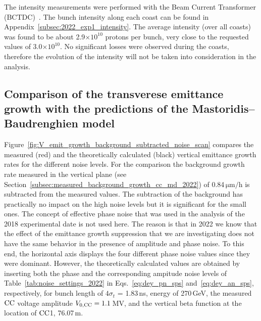 The intensity measurements were performed with the Beam Current Transformer (BCTDC)~\cite{Jones:1982418, Jakob:624188}. The bunch intensity along each coast can be found in Appendix~\ref{subsec:2022_exp1_intensity}. The average intensity (over all coasts) was found to be about 2.9$\times 10^{10}$ protons per bunch, very close to the requested values of 3.0$\times 10^{10}$. No significant losses were observed during the coasts, therefore the evolution of the intensity will not be taken into consideration in the analysis.

\subsection{Comparison of the transverese emittance growth with the predictions of the Mastoridis--Baudrenghien model}\label{sec:cc_exp1_2022_theory_vs_measurements}

Figure~\ref{fig:V_emit_growth_background_subtracted_noise_scan} compares the measured (red) and the theoretically calculated (black) vertical emittance growth rates for the different noise levels. For the comparison the background growth rate measured in the vertical plane (see Section~\ref{subsec:measured_background_growth_cc_md_2022}) of 0.84\,$\mathrm{\mu m /h}$ is subtracted from the measured values. The subtraction of the background has practically no impact on the high noise levels but it is significant for the small ones. The concept of effective phase noise that was used in the analysis of the 2018 experimental date is not used here. The reason is that in 2022 we know that the effect of the emittance growth suppression that we are investigating does not have the same behavior in the presence of amplitude and phase noise. To this end, the horizontal axis displays the four different phase noise values since they were dominant. However, the theoretically calculated values are obtained by inserting both the phase and the corresponding ampitude noise levels of Table~\ref{tab:noise_settings_2022} in Eqs.~\eqref{eq:dey_pn_sps} and~\eqref{eq:dey_an_sps}, respectively, for bunch length of $4 \sigma_t$ = 1.83\,ns, energy of 270\,GeV, the measured ${\mathrm{CC}}$ voltage amplitude ${V_\mathrm{0, CC}}=1.1$\,MV, and the vertical beta function at the location of ${\mathrm{CC}}$1, 76.07\,m.


